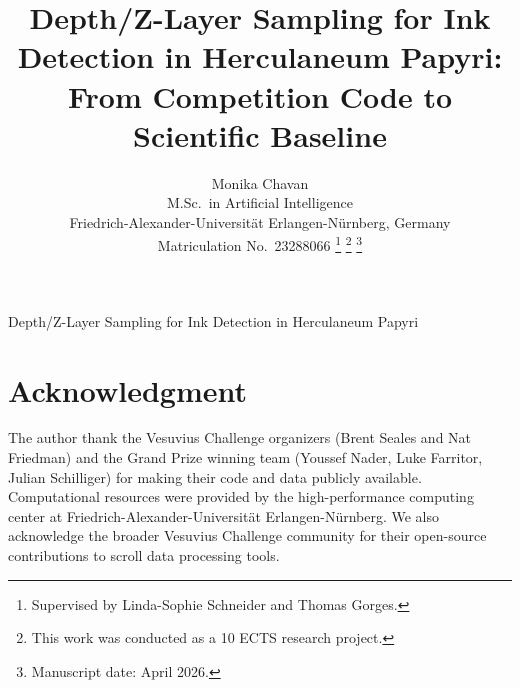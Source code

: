 \documentclass[journal,onecolumn]{IEEEtran}
\begin{document}
\title{Depth/Z-Layer Sampling for Ink Detection in Herculaneum Papyri:\\
From Competition Code to Scientific Baseline}

\author{Monika Chavan\\
M.Sc.\ in Artificial Intelligence\\
Friedrich-Alexander-Universit\"{a}t Erlangen-N\"{u}rnberg, Germany\\
Matriculation No.\ 23288066%
\thanks{Supervised by Linda-Sophie Schneider and Thomas Gorges.}%
\thanks{This work was conducted as a 10 ECTS research project.}%
\thanks{Manuscript date: April 2026.}%
}

%
{Depth/Z-Layer Sampling for Ink Detection in Herculaneum Papyri}

\maketitle



















\section*{Acknowledgment}
The author thank the Vesuvius Challenge organizers (Brent Seales and Nat Friedman) and the Grand Prize winning team (Youssef Nader, Luke Farritor, Julian Schilliger) for making their code and data publicly available. Computational resources were provided by the high-performance computing center at Friedrich-Alexander-Universit\"{a}t Erlangen-N\"{u}rnberg. We also acknowledge the broader Vesuvius Challenge community for their open-source contributions to scroll data processing tools.



\end{document}
